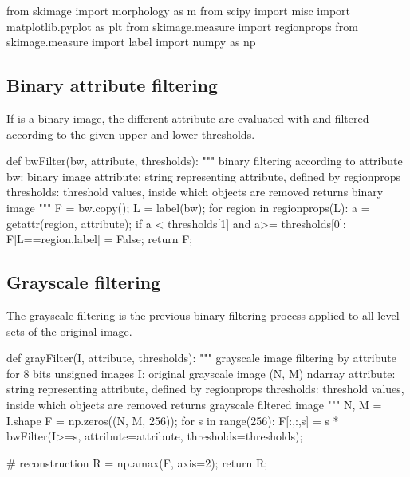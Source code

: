 \def\QRCODE{MASTER_mispa_TUT.IMG.morphological_attribute_filtering_pythonqrcode.png}
\def\QRPAGE{http://www.iptutorials.science/tree/master/MASTER_mispa/TUT.IMG.morphological_attribute_filtering/python}

\begin{python}
from skimage import morphology as m
from scipy import misc
import matplotlib.pyplot as plt
from skimage.measure import regionprops
from skimage.measure import label
import numpy as np
\end{python}

\vspace*{-3pt}

\subsection{Binary attribute filtering}
If  is a binary image, the different attribute are evaluated with  and filtered according to the given upper and lower thresholds.

\begin{python}
def bwFilter(bw, attribute, thresholds):
    """
    binary filtering according to attribute
    bw: binary image
    attribute: string representing attribute, defined by regionprops
    thresholds: threshold values, inside which objects are removed
    returns binary image
    """    
    F = bw.copy();
    L = label(bw);
    for region in regionprops(L):
        a = getattr(region, attribute);
        if  a < thresholds[1] and a>= thresholds[0]:
            F[L==region.label] = False;
    return F;
\end{python}

\vspace*{-3pt}

\subsection{Grayscale filtering}
The grayscale filtering is the previous binary filtering process applied to all level-sets of the original image. 

\begin{python}
def grayFilter(I, attribute, thresholds):
    """
    grayscale image filtering by attribute
    for 8 bits unsigned images
    I: original grayscale image (N, M) ndarray
    attribute: string representing attribute, defined by regionprops
    thresholds: threshold values, inside which objects are removed
    returns grayscale filtered image
    """
    N, M = I.shape
    F = np.zeros((N, M, 256));
    for s in range(256):
        F[:,:,s] = s * bwFilter(I>=s, attribute=attribute, thresholds=thresholds);
    
    # reconstruction
    R = np.amax(F, axis=2);
    return R;
\end{python}

